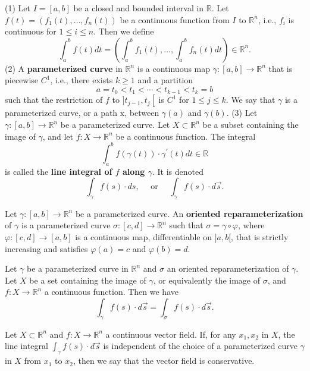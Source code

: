 \documentclass[10pt,landscape, a4paper]{article}
\newcommand{\custombox}[3]{\begin{tcolorbox}[left=0mm,right=0mm,bottom=0mm,top=0mm,title = \textbf{#1}, colback=#2!10!white, colframe = #2!70!white, coltitle=white, breakable]
    #3
    \end{tcolorbox}}
\newcommand{\definition}[2]{\custombox{Definition #1}{red}{#2}}
\newcommand{\prop}[2]{\custombox{Proposition #1}{black!50!orange!30!yellow}{#2}}
\newcommand{\R}{\mathbb{R}}
\newcommand{\Rn}{\R^n}
\begin{document}
\begin{multicols*}{3}
    \definition{4.1.1. (parameterized curve, line integral)}{(1) Let $I=[a, b]$ be a closed and bounded interval in $\R$. Let $f(t)=\left(f_{1}(t), \ldots, f_{n}(t)\right)$
    be a continuous function from $I$ to $\Rn$, i.e., $f_{i}$ is continuous for $1 \leqslant i \leqslant n$. Then we define
    $$
        \int_{a}^{b} f(t) d t=\left(\int_{a}^{b} f_{1}(t), \ldots, \int_{a}^{b} f_{n}(t) d t\right) \in \Rn .
    $$
    (2) A \textbf{parameterized curve} in $\Rn$ is a continuous map $\gamma:[a, b] \rightarrow \Rn$ that is piecewise $C^{1}$, i.e., there exists $k \geqslant 1$ and a partition
    $$
        a=t_{0}<t_{1}<\cdots<t_{k-1}<t_{k}=b
    $$
    such that the restriction of $f$ to $] t_{j-1}, t_{j}\left[\right.$ is $C^{1}$ for $1 \leqslant j \leqslant k$. We say that $\gamma$ is a parameterized curve, or a path $\mathrm{x}$, between $\gamma(a)$ and $\gamma(b)$.
    (3) Let $\gamma:[a, b] \rightarrow \Rn$ be a parameterized curve. Let $X \subset \Rn$ be a subset containing the image of $\gamma$, and let $f: X \rightarrow \Rn$ be a continuous function. The integral
    $$
        \int_{a}^{b} f(\gamma(t)) \cdot \gamma^{\prime}(t) d t \in \R
    $$
    is called the \textbf{line integral of $f$ along $\gamma$}. It is denoted
    $$
        \int_{\gamma} f(s) \cdot d s, \quad \text { or } \quad \int_{\gamma} f(s) \cdot d \vec{s} .
    $$
    }

    \definition{4.1.4}{
    Let $\gamma:[a, b] \rightarrow \Rn$ be a parameterized curve. An \textbf{oriented reparameterization} of $\gamma$ is a parameterized curve $\sigma:[c, d] \rightarrow \Rn$ such that $\sigma=\gamma \circ \varphi$, where $\varphi:[c, d] \rightarrow[a, b]$ is a continuous map, differentiable on $] a, b[$, that is strictly increasing and satisfies $\varphi(a)=c$ and $\varphi(b)=d$.
    }

    \prop{4.1.5.}{Let $\gamma$ be a parameterized curve in $\Rn$ and $\sigma$ an oriented reparameterization of $\gamma$. Let $X$ be a set containing the image of $\gamma$, or equivalently the image of $\sigma$, and $f: X \rightarrow \Rn$ a continuous function. Then we have
        $$
            \int_{\gamma} f(s) \cdot d \vec{s}=\int_{\sigma} f(s) \cdot d \vec{s} .
        $$}

    \definition{4.1.8}{
        Let $X \subset \Rn$ and $f: X \rightarrow \Rn$ a continuous vector field. If, for any $x_{1}, x_{2}$ in $X$, the line integral
        $
            \int_{\gamma} f(s) \cdot d \vec{s}
        $
        is independent of the choice of a parameterized curve $\gamma$ in $X$ from $x_{1}$ to $x_{2}$, then we say that the vector field is conservative.
    }


\end{multicols*}
\end{document}
